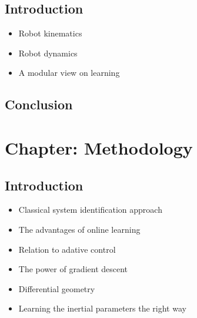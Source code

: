 \documentclass[12pt, a4paper]{article}
\begin{document}
\subsection*{Introduction}
\begin{itemize}
	\item Robot kinematics
	\item Robot dynamics
	\item A modular view on learning
	
	
\end{itemize}
\subsection*{Conclusion}


\section*{Chapter: Methodology}

\subsection*{Introduction}
\begin{itemize}
	\item Classical system identification approach
	\item The advantages of online learning
	\item Relation to adative control
	\item The power of gradient descent
	\item Differential geometry
	\item Learning the inertial parameters the right way
	
\end{itemize}
\end{document}
